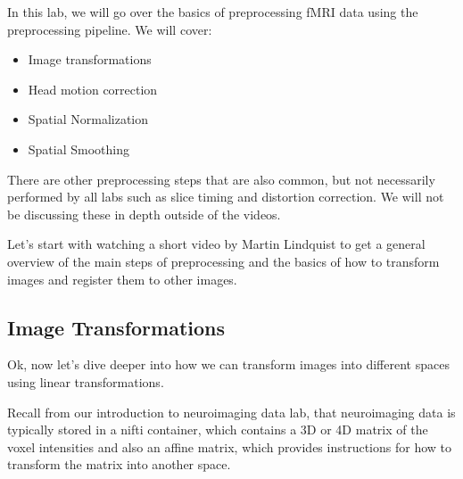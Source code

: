\documentclass[letterpaper,10pt,english]{sphinxmanual}
\begin{document}

In this lab, we will go over the basics of preprocessing fMRI data using the  preprocessing pipeline. We will cover:
\begin{itemize}
\item {} 
Image transformations

\item {} 
Head motion correction

\item {} 
Spatial Normalization

\item {} 
Spatial Smoothing

\end{itemize}

There are other preprocessing steps that are also common, but not necessarily performed by all labs such as slice timing and distortion correction. We will not be discussing these in depth outside of the videos.

Let’s start with watching a short video by Martin Lindquist to get a general overview of the main steps of preprocessing and the basics of how to transform images and register them to other images.

\begin{sphinxVerbatim}[commandchars=\\\{\}]
   

\end{sphinxVerbatim}

\noindent{}


\subsection{Image Transformations}
\label{\detokenize{content/Preprocessing:image-transformations}}
Ok, now let’s dive deeper into how we can transform images into different spaces using linear transformations.

Recall from our introduction to neuroimaging data lab, that neuroimaging data is typically stored in a nifti container, which contains a 3D or 4D matrix of the voxel intensities and also an affine matrix, which provides instructions for how to transform the matrix into another space.
\end{document}
